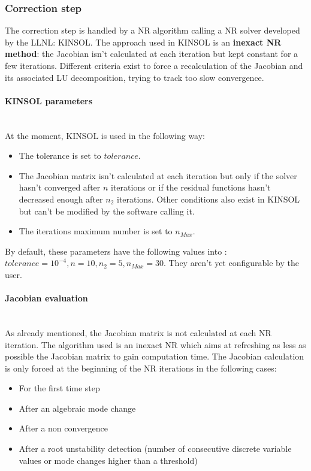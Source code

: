 \documentclass[a4paper, 12pt]{report}
\begin{document}
\subsubsection{Correction step}

The correction step is handled by a \ac{NR} algorithm calling a \ac{NR} solver developed by the \ac{LLNL}: \ac{KINSOL}. The approach used in \ac{KINSOL} is an \textbf{inexact \ac{NR} method}: the Jacobian isn't calculated at each iteration but kept constant for a few iterations. Different criteria exist to force a recalculation of the Jacobian and its associated LU decomposition, trying to track too slow convergence.

\paragraph{KINSOL parameters}
~~\\

At the moment, \ac{KINSOL} is used in the following way:
\begin{itemize}
\item The tolerance is set to $tolerance$.
\item The Jacobian matrix isn't calculated at each iteration but only if the solver hasn't converged after $n$ iterations or if the residual functions hasn't decreased enough after $n_2$ iterations. Other conditions also exist in \ac{KINSOL} but can't be modified by the software calling it.
\item The iterations maximum number is set to $n_{Max}$.
\end{itemize}

By default, these parameters have the following values into \Dynawo :
$tolerance = 10^{-4}, n = 10, n_2 = 5, n_{Max} = 30$.
They aren't yet configurable by the user.

\paragraph{Jacobian evaluation}
~~\\

As already mentioned, the Jacobian matrix is not calculated at each \ac{NR} iteration. The algorithm used is an inexact \ac{NR} which aims at refreshing as less as possible the Jacobian matrix to gain computation time. The Jacobian calculation is only forced at the beginning of the \ac{NR} iterations in the following cases:
\begin{itemize}
\item For the first time step
\item After an algebraic mode change
\item After a non convergence
\item After a root unstability detection (number of consecutive discrete variable values or mode changes higher than a threshold)
\end{itemize}
\end{document}
